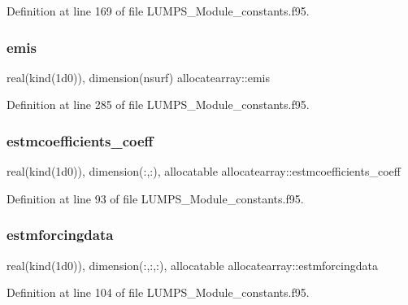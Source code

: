 Definition at line 169 of file L\+U\+M\+P\+S\+\_\+\+Module\+\_\+constants.\+f95.

\mbox{\label{namespaceallocatearray_a5780572b4c9bdc7bbf20e4ee9d72010e}} 
\subsubsection{\texorpdfstring{emis}{emis}}
{\footnotesize\ttfamily real(kind(1d0)), dimension(nsurf) allocatearray\+::emis}



Definition at line 285 of file L\+U\+M\+P\+S\+\_\+\+Module\+\_\+constants.\+f95.

\mbox{\label{namespaceallocatearray_a7d74d9d08873f1a7215ac88608434548}} 
\subsubsection{\texorpdfstring{estmcoefficients\+\_\+coeff}{estmcoefficients\_coeff}}
{\footnotesize\ttfamily real(kind(1d0)), dimension(\+:,\+:), allocatable allocatearray\+::estmcoefficients\+\_\+coeff}



Definition at line 93 of file L\+U\+M\+P\+S\+\_\+\+Module\+\_\+constants.\+f95.

\mbox{\label{namespaceallocatearray_aa23b27435b5039423f72672a260b1482}} 
\subsubsection{\texorpdfstring{estmforcingdata}{estmforcingdata}}
{\footnotesize\ttfamily real(kind(1d0)), dimension(\+:,\+:,\+:), allocatable allocatearray\+::estmforcingdata}



Definition at line 104 of file L\+U\+M\+P\+S\+\_\+\+Module\+\_\+constants.\+f95.

\mbox{\label{namespaceallocatearray_a04e38e0bbfe4006aeadc08af89caa7be}} 
